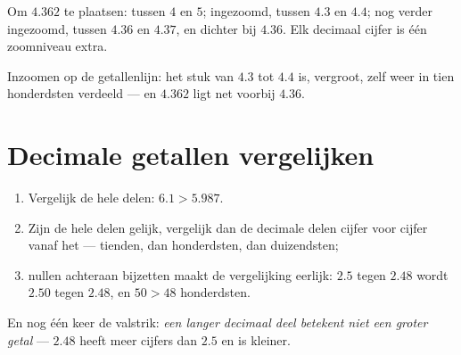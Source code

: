 \begin{example}\label{ex:g5:decimals:line}
Om $4.362$ te plaatsen: tussen $4$ en $5$; ingezoomd, tussen $4.3$ en
$4.4$; nog verder ingezoomd, tussen $4.36$ en $4.37$, en dichter bij
$4.36$. Elk decimaal cijfer is één zoomniveau extra.
\end{example}

\begin{omfigure}

{\small Inzoomen op de getallenlijn: het stuk van $4.3$ tot $4.4$ is,
vergroot, zelf weer in tien honderdsten verdeeld --- en $4.362$ ligt net
voorbij $4.36$.}
\end{omfigure}

\section{Decimale getallen vergelijken}

\begin{method}\label{met:g5:decimals:compare}
\begin{enumerate}
  \item Vergelijk de hele delen: $6.1 > 5.987$.
  \item Zijn de hele delen gelijk, vergelijk dan de decimale delen cijfer
        voor cijfer vanaf het  --- tienden, dan honderdsten,
        dan duizendsten;
  \item nullen achteraan bijzetten maakt de vergelijking eerlijk:
        $2.5$ tegen $2.48$ wordt $2.50$ tegen $2.48$, en $50 > 48$
        honderdsten.
\end{enumerate}
En nog één keer de valstrik: \emph{een langer decimaal deel betekent niet
een groter getal} --- $2.48$ heeft meer cijfers dan $2.5$ en is kleiner.
\end{method}

